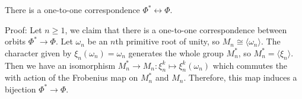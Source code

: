 \begin{dang}
    \begin{lemma}\label{Lemma: one-to-one correspondence between orbits}
        There is a one-to-one correspondence $\Phi^*\longleftrightarrow \Phi$.
    \end{lemma}
\end{dang}
Proof: Let $n\geq1$, we claim that there is a one-to-one correspondence between orbits $\Phi^*\rightarrow \Phi$.  Let $\omega_n$ be an $n$th primitive root of unity, so $M_n \cong \langle\omega_n\rangle$. The character given by $\xi_n(\omega_n)=\omega_n$ generates the whole group $M_n^*$, so $M_n^*=\langle\xi_n\rangle$. Then we have an isomorphism $M_n^*\rightarrow M_n: \xi_n^k\mapsto \xi_n^k(\omega_n)$ which commutes the with action of the Frobenius map on $M_n^*$ and $M_n$. Therefore, this map induces a bijection $\Phi^*\rightarrow \Phi$.

